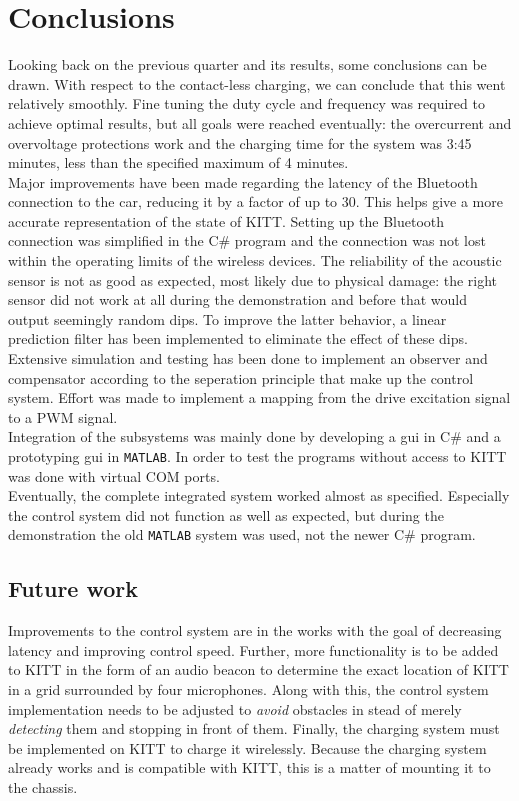 \documentclass[11pt,titlepage]{report}
\begin{document}
\chapter{Conclusions}
\label{ch:conclusions}
Looking back on the previous quarter and its results, some conclusions can be drawn. With respect to the contact-less charging, we can conclude that this went relatively smoothly. Fine tuning the duty cycle and frequency was required to achieve optimal results, but all goals were reached eventually: the overcurrent and overvoltage protections work and the charging time for the system was 3:45 minutes, less than the specified maximum of 4 minutes. \\
Major improvements have been made regarding the latency of the Bluetooth connection to the car, reducing it by a factor of up to 30. This helps give a more accurate representation of the state of KITT. Setting up the Bluetooth connection was simplified in the C\# program and the connection was not lost within the operating limits of the wireless devices. The reliability of the acoustic sensor is not as good as expected, most likely due to physical damage: the right sensor did not work at all during the demonstration and before that would output seemingly random dips. To improve the latter behavior, a linear prediction filter has been implemented to eliminate the effect of these dips.\\
Extensive simulation and testing has been done to implement an observer and compensator according to the seperation principle that make up the control system. Effort was made to implement a mapping from the drive excitation signal to a PWM signal.\\
Integration of the subsystems was mainly done by developing a gui in C\# and a prototyping gui in \texttt{MATLAB}. In order to test the programs without access to KITT was done with virtual COM ports. \\
Eventually, the complete integrated system worked almost as specified. Especially the control system did not function as well as expected, but during the demonstration the old \texttt{MATLAB} system was used, not the newer C\# program.

\section{Future work}
Improvements to the control system are in the works with the goal of decreasing latency and improving control speed. Further, more functionality is to be added to KITT in the form of an audio beacon to determine the exact location of KITT in a grid surrounded by four microphones. Along with this, the control system implementation needs to be adjusted to \textit{avoid} obstacles in stead of merely \textit{detecting} them and stopping in front of them. Finally, the charging system must be implemented on KITT to charge it wirelessly. Because the charging system already works and is compatible with KITT, this is a matter of mounting it to the chassis.
\end{document}
